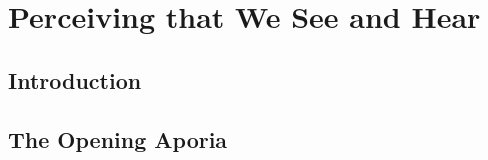\chapter{Perceiving that We See and Hear} %
\label{cha:perceiving}

\section{Introduction} %
\label{sec:introduction}




\section{The Opening Aporia} %
\label{sec:the_opening_aporia}




